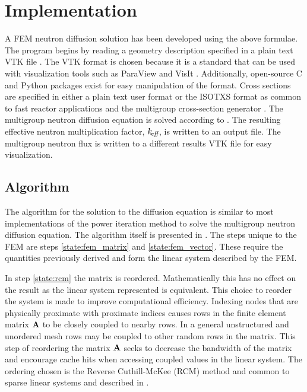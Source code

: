\section{Implementation}
  A FEM neutron diffusion solution has been developed using 
  the above formulae. The program begins by reading a geometry description 
  specified in a plain text VTK file \cite{vtk}. The VTK format is chosen 
  because it is a standard that can be used with visualization tools such as 
  ParaView \cite{ParaView} and VisIt \cite{VisIt}. Additionally, open-source C 
  and Python packages exist for easy manipulation of the format. Cross sections
  are specified in either a plain text user format or the ISOTXS format as 
  common to fast reactor applications and the multigroup cross-section generator
  \mcc \cite{mcc}. The multigroup neutron diffusion equation is solved according
  to . The resulting effective neutron multiplication 
  factor, $k_{\!\mbox{\scriptsize \em eff}}$, is written to an output file. The multigroup neutron flux is
  written to a different results VTK file for easy visualization.

  \subsection{Algorithm}
    The algorithm for the solution to the diffusion equation is similar to most
    implementations of the power iteration method to solve the multigroup
    neutron diffusion equation. The algorithm itself is presented in 
    . The steps unique to the FEM are steps 
    \ref{state:fem_matrix} and \ref{state:fem_vector}. These require the 
    quantities previously derived and form the linear system described by the 
    FEM. 
    
    In step \ref{state:rcm} the matrix is reordered. Mathematically this has no
    effect on the result as the linear system represented is equivalent. This 
    choice to reorder the system is made to improve computational efficiency. 
    Indexing nodes that are physically proximate with proximate indices causes 
    rows in the finite element matrix $\mathbf{A}$ to be closely coupled to nearby
    rows. In a general unstructured and unordered mesh rows may be coupled to 
    other random rows in the matrix. This step of reordering the matrix $\mathbf{A}$ 
    seeks to decrease the bandwidth of the matrix and encourage cache hits when
    accessing coupled values in the linear system. The ordering chosen is the
    Reverse Cuthill-McKee (RCM) method and common to sparse linear systems and 
    described in \cite{rcm}.
    
